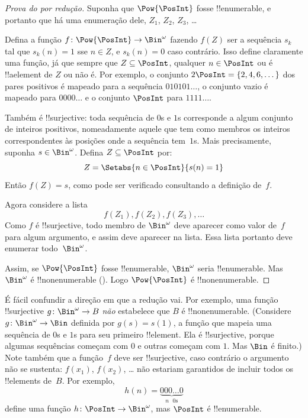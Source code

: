 \documentclass[../../../include/open-logic-section]{subfiles}
\begin{document}
\begin{proof}[Prova do {} por redução]
Suponha que $\Pow{\PosInt}$ fosse !!{enumerable}, e portanto que
há uma enumeração dele, $Z_{1}$, $Z_{2}$, $Z_{3}$, \dots

Defina a função $f \colon \Pow{\PosInt} \to \Bin^\omega$ fazendo
$f(Z)$ ser a sequência $s_{k}$ tal que $s_{k}(n) = 1$ sse $n \in Z$,
e $s_k(n) = 0$ caso contrário. Isso define claramente uma função, já que
sempre que $Z \subseteq \PosInt$, qualquer $n \in \PosInt$ ou é
!!a{element} de $Z$ ou não é. Por exemplo, o conjunto $2\PosInt = \{2,
4, 6, \dots\}$ dos pares positivos é mapeado para a sequência
$010101\dots$, o conjunto vazio é mapeado para $0000\dots$ e o conjunto
$\PosInt$ para $1111\dots$.

Também é !!{surjective}: toda sequência de $0$s e $1$s corresponde
a algum conjunto de inteiros positivos, nomeadamente aquele que tem como
membros os inteiros correspondentes às posições onde a sequência
tem~$1$s. Mais precisamente, suponha $s \in \Bin^\omega$. Defina $Z
\subseteq \PosInt$ por:
\[
Z = \Setabs{n \in \PosInt}{s(n) = 1}
\]
Então $f(Z) = s$, como pode ser verificado consultando a definição
de~$f$.

Agora considere a lista
\[
f(Z_1), f(Z_2), f(Z_3), \dots
\]
Como $f$ é !!{surjective}, todo membro de $\Bin^\omega$ deve
aparecer como valor de~$f$ para algum argumento, e assim deve aparecer na
lista. Essa lista portanto deve enumerar todo~$\Bin^\omega$.

Assim, se $\Pow{\PosInt}$ fosse !!{enumerable}, $\Bin^\omega$ seria
!!{enumerable}. Mas $\Bin^\omega$ é !!{nonenumerable}
(). Logo $\Pow{\PosInt}$ é
!!{nonenumerable}.
\end{proof}

\begin{explain}
É fácil confundir a direção em que a redução vai.
Por exemplo, uma função !!{surjective} $g \colon \Bin^\omega \to B$
\emph{não} estabelece que $B$ é !!{nonenumerable}. (Considere $g
\colon \Bin^\omega \to \Bin$ definida por $g(s) = s(1)$, a função
que mapeia uma sequência de $0$s e $1$s para seu primeiro !!{element}. Ela
é !!{surjective}, porque algumas sequências começam com $0$ e outras começam
com $1$. Mas $\Bin$ é finito.) Note também que a função~$f$ deve
ser !!{surjective}, caso contrário o argumento não se sustenta:
$f(x_1)$, $f(x_2)$, \dots{} não estariam garantidos de incluir
todos os !!{element}s de~$B$. Por exemplo,
\[
h(n) = \underbrace{000\dots0}_{\text{$n$ $0$s}}
\]
define uma função $h\colon \PosInt \to
\Bin^\omega$, mas $\PosInt$ é !!{enumerable}.
\end{explain}
\end{document}
